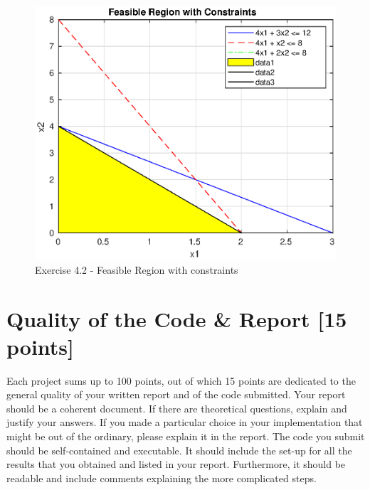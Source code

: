 \documentclass[unicode,11pt,a4paper,oneside,numbers=endperiod,openany]{scrartcl}
\begin{document}
\begin{figure}[H]
	\centering
	\caption{Exercise 4.2 - Feasible Region with constraints}
	\label{fig:ex4-2-plot}
	\includegraphics[width=\textwidth, trim={0cm 0cm 0cm 0cm}]{./figures/ex4-2-plot.eps}
\end{figure}




\section{Quality of the Code \& Report [15 points]}

Each project sums up to 100 points, out of which 15 points are dedicated to the general quality of your written report and of the code submitted. Your report should be a coherent document. If there are theoretical questions, explain and justify your answers. If you made a particular choice in your implementation that might be out of the ordinary, please explain it in the report. The code you submit should be self-contained and executable. It should include the set-up for all the results that you obtained and listed in your report. Furthermore, it should be readable and include comments explaining the more complicated steps.
\end{document}
